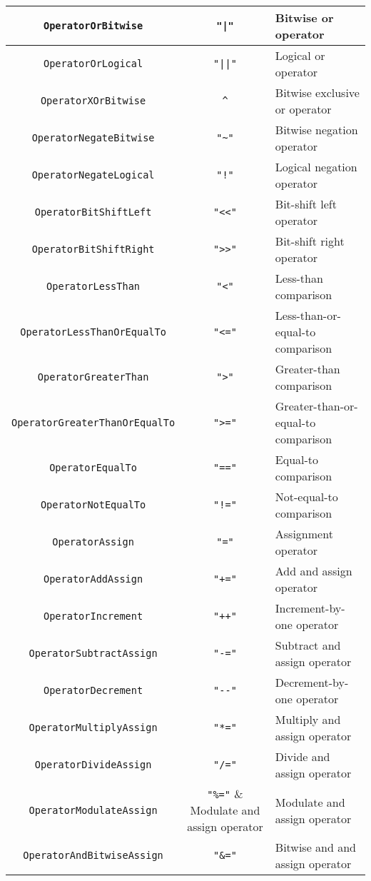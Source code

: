 \documentclass[10pt,a4paper]{article}
\begin{document}
\begin{center}
\begin{tabular}{|c|c|l|}
\hline
\verb|OperatorOrBitwise| & \verb!"|"! & Bitwise or operator \\
\hline
\verb|OperatorOrLogical| & \verb!"||"! & Logical or operator \\
\hline
\verb|OperatorXOrBitwise| & \verb|^| & Bitwise exclusive or operator \\
\hline
\verb|OperatorNegateBitwise| & \verb|"~"| & Bitwise negation operator \\
\hline
\verb|OperatorNegateLogical| & \verb|"!"| & Logical negation operator \\
\hline
\verb|OperatorBitShiftLeft| & \verb|"<<"| & Bit-shift left operator \\
\hline
\verb|OperatorBitShiftRight| & \verb|">>"| & Bit-shift right operator \\
\hline
\verb|OperatorLessThan| & \verb|"<"| & Less-than comparison \\
\hline
\verb|OperatorLessThanOrEqualTo| & \verb|"<="| & Less-than-or-equal-to comparison \\
\hline
\verb|OperatorGreaterThan| & \verb|">"| & Greater-than comparison \\
\hline
\verb|OperatorGreaterThanOrEqualTo| & \verb|">="| & Greater-than-or-equal-to comparison \\
\hline
\verb|OperatorEqualTo| & \verb|"=="| & Equal-to comparison \\
\hline
\verb|OperatorNotEqualTo| & \verb|"!="| & Not-equal-to comparison \\
\hline
\verb|OperatorAssign| & \verb|"="| & Assignment operator \\
\hline
\verb|OperatorAddAssign| & \verb|"+="| & Add and assign operator \\
\hline
\verb|OperatorIncrement| & \verb|"++"| & Increment-by-one operator \\
\hline
\verb|OperatorSubtractAssign| & \verb|"-="| & Subtract and assign operator \\
\hline
\verb|OperatorDecrement| & \verb|"--"| & Decrement-by-one operator \\
\hline
\verb|OperatorMultiplyAssign| & \verb|"*="| & Multiply and assign operator \\
\hline
\verb|OperatorDivideAssign| & \verb|"/="| & Divide and assign operator \\
\hline
\verb|OperatorModulateAssign| & \verb|"%="| & Modulate and assign operator \\
\hline
\verb|OperatorAndBitwiseAssign| & \verb|"&="| & Bitwise and and assign operator \\

\end{tabular}
\end{center}
\end{document}
